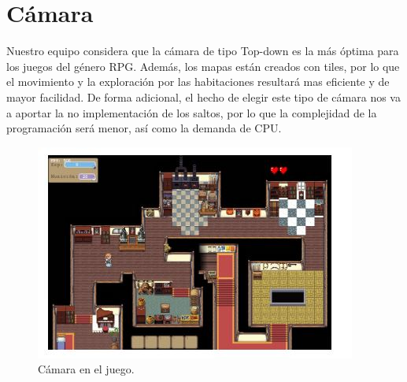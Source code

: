 \section{Cámara}

Nuestro equipo considera que la cámara de tipo Top-down es la más óptima para los juegos del género RPG. Además, los mapas están creados con tiles, por lo que el movimiento y la exploración por las habitaciones resultará mas eficiente y de mayor facilidad. De forma adicional, el hecho de elegir este tipo de cámara nos va a aportar la no implementación de los saltos, por lo que la complejidad de la programación será menor, así como la demanda de CPU.

\begin{figure}[!htb]
  \centering
    \includegraphics[width=0.7\linewidth]{./img/4.JPG}
    \caption{Cámara en el juego.}
  \label{fig:yo}
\end{figure}

